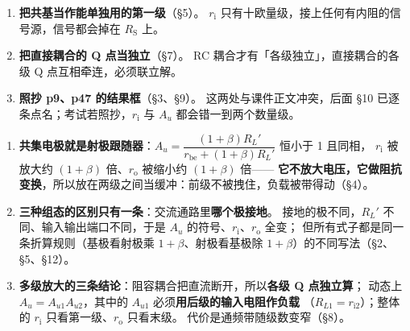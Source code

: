 \documentclass[11pt]{ctexart}
\begin{document}
\begin{enumerate}
\item \textbf{把共基当作能单独用的第一级}（§5）。
$r_{\mathrm{i}}$ 只有十欧量级，接上任何有内阻的信号源，信号都会掉在 $R_{\mathrm{S}}$ 上。

\item \textbf{把直接耦合的 Q 点当独立}（§7）。
RC 耦合才有「各级独立」，直接耦合的各级 Q 点互相牵连，必须联立解。

\item \textbf{照抄 p9、p47 的结果框}（§3、§9）。
这两处与课件正文冲突，后面 §10 已逐条点名；考试若照抄，$r_{\mathrm{i}}$ 与 $A_u$ 都会错一到两个数量级。

\end{enumerate}


\begin{enumerate}

\item \textbf{共集电极就是射极跟随器}：$A_u=\dfrac{(1+\beta)R_L'}{r_{\mathrm{be}}+(1+\beta)R_L'}$ 恒小于 1 且同相，
$r_{\mathrm{i}}$ 被放大约 $(1+\beta)$ 倍、$r_{\mathrm{o}}$ 被缩小约 $(1+\beta)$ 倍——
\textbf{它不放大电压，它做阻抗变换}，所以放在两级之间当缓冲：前级不被拽住，负载被带得动（§4）。

\item \textbf{三种组态的区别只有一条}：交流通路里\textbf{哪个极接地}。
接地的极不同，$R_L'$ 不同、输入输出端口不同，于是 $A_u$ 的符号、$r_{\mathrm{i}}$、$r_{\mathrm{o}}$ 全变；
但所有式子都是同一条折算规则（基极看射极乘 $1+\beta$、射极看基极除 $1+\beta$）的不同写法（§2、§5、§12）。

\item \textbf{多级放大的三条结论}：阻容耦合把直流断开，所以\textbf{各级 Q 点独立算}；
动态上 \textbf{$A_u=A_{u1}A_{u2}$}，其中的 $A_{u1}$ 必须\textbf{用后级的输入电阻作负载}
（$R_{L1}=r_{\mathrm{i}2}$）；整体的 $r_{\mathrm{i}}$ 只看第一级、$r_{\mathrm{o}}$ 只看末级。
代价是通频带随级数变窄（§8）。

\end{enumerate}

\end{document}
